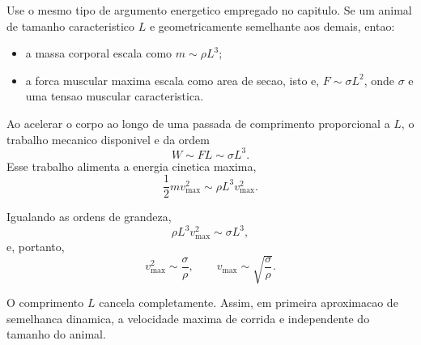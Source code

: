 Use o mesmo tipo de argumento energetico empregado no capitulo. Se um animal de tamanho caracteristico $L$ e geometricamente semelhante aos demais, entao:

\begin{itemize}
\item a massa corporal escala como $m\sim \rho L^3$;
\item a forca muscular maxima escala como area de secao, isto e, $F\sim \sigma L^2$, onde $\sigma$ e uma tensao muscular caracteristica.
\end{itemize}

Ao acelerar o corpo ao longo de uma passada de comprimento proporcional a $L$, o trabalho mecanico disponivel e da ordem
\[
W\sim FL\sim \sigma L^3.
\]
Esse trabalho alimenta a energia cinetica maxima,
\[
\frac{1}{2}mv_{\max}^2\sim \rho L^3 v_{\max}^2.
\]

Igualando as ordens de grandeza,
\[
\rho L^3 v_{\max}^2\sim \sigma L^3,
\]
e, portanto,
\[
v_{\max}^2\sim \frac{\sigma}{\rho},
\qquad
v_{\max}\sim \sqrt{\frac{\sigma}{\rho}}.
\]

O comprimento $L$ cancela completamente. Assim, em primeira aproximacao de semelhanca dinamica, a velocidade maxima de corrida e independente do tamanho do animal.

